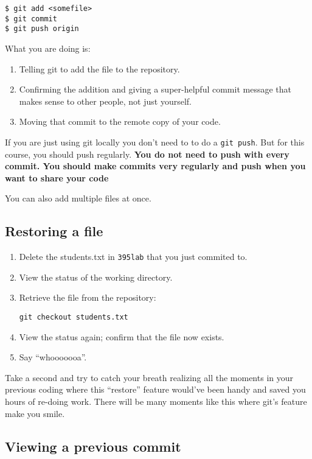 \documentclass[letterpaper]{article}
\begin{document}
\begin{verbatim}
$ git add <somefile>
$ git commit
$ git push origin
\end{verbatim}

What you are doing is:

\begin{enumerate}
\item Telling git to add the file to the repository.
\item Confirming the addition and giving a super-helpful commit message that
makes sense to other people, not just yourself.
\item Moving that commit to the remote copy of your code.
\end{enumerate}

If you are just using git locally you don't need to to do a \verb+git push+.
But for this course, you should push regularly.  {\bf You do not need to push
with every commit.  You should make commits very regularly and push when you
want to share your code}

You can also add multiple files at once.

\subsection*{Restoring a file}

\begin{enumerate}
\item Delete the students.txt in {\tt 395lab} that you just commited to.
\item View the status of the working directory.
\item Retrieve the file from the repository:
\begin{verbatim}
git checkout students.txt
\end{verbatim}
\item View the status again; confirm that the file now exists.
\item Say ``whooooooa''.
\end{enumerate}

Take a second and try to catch your breath realizing all the moments in your
previous coding where this ``restore'' feature would've been handy and saved
you hours of re-doing work.  There will be many moments like this where git's
feature make you smile.

\subsection*{Viewing a previous commit}
\end{document}
